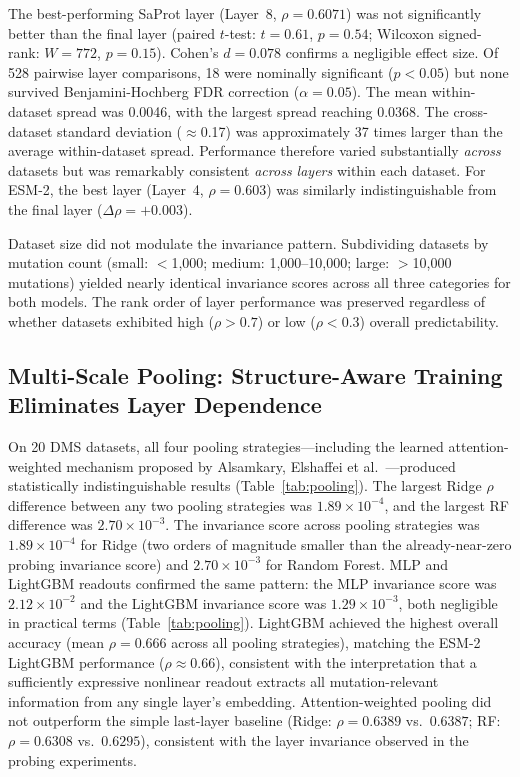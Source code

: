 \documentclass[11pt,a4paper]{article}
\begin{document}
The best-performing SaProt layer (Layer~8, $\rho = 0.6071$) was not significantly
better than the final layer (paired $t$-test: $t = 0.61$, $p = 0.54$; Wilcoxon signed-rank:
$W = 772$, $p = 0.15$). Cohen's $d = 0.078$ confirms a negligible effect size.
Of 528 pairwise layer comparisons, 18 were nominally significant ($p < 0.05$)
but none survived Benjamini-Hochberg FDR correction ($\alpha = 0.05$).
The mean within-dataset spread was 0.0046, with the largest spread reaching 0.0368.
The cross-dataset standard deviation ($\approx$0.17) was approximately 37 times larger
than the average within-dataset spread. Performance therefore varied substantially
\emph{across} datasets but was remarkably consistent \emph{across layers} within
each dataset. For ESM-2, the best layer (Layer~4, $\rho = 0.603$) was similarly
indistinguishable from the final layer ($\Delta\rho = +0.003$).

Dataset size did not modulate the invariance pattern. Subdividing datasets by
mutation count (small: $<$1,000; medium: 1,000--10,000; large: $>$10,000
mutations) yielded nearly identical invariance scores across all three categories
for both models. The rank order of layer performance was preserved
regardless of whether datasets exhibited high ($\rho > 0.7$) or low
($\rho < 0.3$) overall predictability.

\subsection{Multi-Scale Pooling: Structure-Aware Training Eliminates Layer Dependence}

On 20 DMS datasets, all four pooling
strategies---including the learned attention-weighted mechanism proposed by
Alsamkary, Elshaffei et al.~\cite{elshaffei2025}---produced
statistically indistinguishable results (Table~\ref{tab:pooling}). The
largest Ridge $\rho$ difference between any two pooling strategies was
$1.89 \times 10^{-4}$, and the largest RF difference was $2.70 \times 10^{-3}$.
The invariance score across pooling strategies was $1.89 \times 10^{-4}$ for
Ridge (two orders of magnitude smaller than the already-near-zero probing
invariance score) and $2.70 \times 10^{-3}$ for Random Forest.
MLP and LightGBM readouts confirmed the same pattern: the MLP invariance score
was $2.12 \times 10^{-2}$ and the LightGBM invariance score was $1.29 \times 10^{-3}$,
both negligible in practical terms (Table~\ref{tab:pooling}). LightGBM achieved
the highest overall accuracy (mean $\rho = 0.666$ across all pooling strategies),
matching the ESM-2 LightGBM performance ($\rho \approx 0.66$), consistent with
the interpretation that a sufficiently expressive nonlinear readout extracts
all mutation-relevant information from any single layer's embedding.
Attention-weighted pooling did not outperform the simple last-layer baseline
(Ridge: $\rho = 0.6389$ vs.\ $0.6387$; RF: $\rho = 0.6308$ vs.\ $0.6295$),
consistent with the layer invariance observed in the probing experiments.
\end{document}
